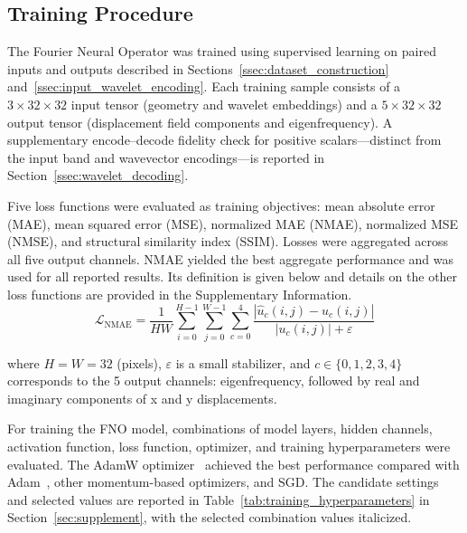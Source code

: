\documentclass[preprint,review,12pt,numafflabel]{elsarticle}
\begin{document}


\subsection{Training Procedure}
\label{ssec:training_procedure}
The Fourier Neural Operator was trained using supervised learning on paired inputs and outputs described in Sections~\ref{ssec:dataset_construction} and~\ref{ssec:input_wavelet_encoding}. Each training sample consists of a $3 \times 32 \times 32$ input tensor (geometry and wavelet embeddings) and a $5 \times 32 \times 32$ output tensor (displacement field components and eigenfrequency). A supplementary encode--decode fidelity check for positive scalars---distinct from the input band and wavevector encodings---is reported in Section~\ref{ssec:wavelet_decoding}.

Five loss functions were evaluated as training objectives: mean absolute error (MAE), mean squared error (MSE), normalized MAE (NMAE), normalized MSE (NMSE), and structural similarity index (SSIM). Losses were aggregated across all five output channels. NMAE yielded the best aggregate performance and was used for all reported results. Its definition is given below and details on the other loss functions are provided in the Supplementary Information.
\begin{equation*}
    \mathcal{L}_{\text{NMAE}} = \frac{1}{HW} \sum_{i=0}^{H-1} \sum_{j=0}^{W-1} \sum_{c=0}^{4} \frac{\displaystyle \left| \hat{u}_{c}(i,j) - u_{c}(i,j) \right|}{\left| u_{c}(i,j) \right| + \varepsilon}
\end{equation*}

where $H = W = 32$ (pixels), $\varepsilon$ is a small stabilizer, and $c \in \{0,1,2,3,4\}$ corresponds to the 5 output channels: eigenfrequency, followed by real and imaginary components of x and y displacements.

For training the FNO model, combinations of model layers, hidden channels, activation function, loss function, optimizer, and training hyperparameters were evaluated. The AdamW optimizer~\cite{loshchilov2019adamw} achieved the best performance compared with Adam~\cite{kingma2015adam}, other momentum-based optimizers, and SGD. The candidate settings and selected values are reported in Table~\ref{tab:training_hyperparameters} in Section~\ref{sec:supplement}, with the selected combination values italicized.
\end{document}
